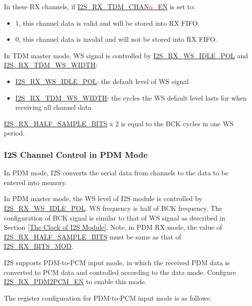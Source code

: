 \documentclass[main\_\_CN.tex]{subfiles}
\begin{document}
In these RX channels, if  \hyperref[fielddesc:I2STXTDMCHAN0EN]{I2S\_RX\_TDM\_CHAN{\textcolor{red}{n}}\_EN}  is set to:
\begin{itemize}
    \item 1, this channel data is valid and will be stored into RX FIFO.
    \item 0, this channel data is invalid and will not be stored into RX FIFO.
\end{itemize}
In TDM master mode, WS signal is controlled by  \hyperref[fielddesc:I2SRXWSIDLEPOL]{I2S\_RX\_WS\_IDLE\_POL} and  \hyperref[fielddesc:I2SRXTDMWSWIDTH]{I2S\_RX\_TDM\_WS\_WIDTH}:
\begin{itemize}
\item \hyperref[fielddesc:I2SRXWSIDLEPOL]{I2S\_RX\_WS\_IDLE\_POL}: the default level of WS signal
\item \hyperref[fielddesc:I2SRXTDMWSWIDTH]{I2S\_RX\_TDM\_WS\_WIDTH}: the cycles the WS default level lasts for when receiving all channel data
\end{itemize} \hyperref[fielddesc:I2SRXHALFSAMPLEBITS]{I2S\_RX\_HALF\_SAMPLE\_BITS} x 2 is equal to the BCK cycles in one WS period.


\subsubsection{I2S Channel Control in PDM Mode}
In PDM mode, I2S converts the serial data from channels to the data to be entered into memory.

In PDM master mode, the WS level of I2S module is controlled by  \hyperref[fielddesc:I2SRXWSIDLEPOL]{I2S\_RX\_WS\_IDLE\_POL}. WS frequency is half of BCK frequency. The configuration of BCK signal is similar to that of WS signal as described in Section  \ref{The Clock of I2S Module}. Note, in PDM RX mode, the value of  \hyperref[fielddesc:I2SRXHALFSAMPLEBITS]{I2S\_RX\_HALF\_SAMPLE\_BITS} must be same as that of  \hyperref[fielddesc:I2SRXBITSMOD]{I2S\_RX\_BITS\_MOD}.

I2S supports PDM-to-PCM input mode, in which the received PDM data is converted to PCM data and controlled according to the data mode. Configure  \hyperref[fielddesc:I2SRXPDM2PCMEN]{I2S\_RX\_PDM2PCM\_EN} to enable this mode.


The register configuration for PDM-to-PCM input mode is as follows:
\end{document}
